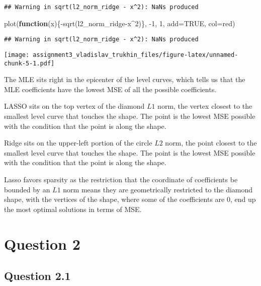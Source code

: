 \documentclass[
]{article}
\newenvironment{Shaded}{\begin{snugshade}}{\end{snugshade}}
\newcommand{\AttributeTok}[1]{\textcolor[rgb]{0.77,0.63,0.00}{#1}}
\newcommand{\ConstantTok}[1]{\textcolor[rgb]{0.00,0.00,0.00}{#1}}
\newcommand{\ControlFlowTok}[1]{\textcolor[rgb]{0.13,0.29,0.53}{\textbf{#1}}}
\newcommand{\DecValTok}[1]{\textcolor[rgb]{0.00,0.00,0.81}{#1}}
\newcommand{\FunctionTok}[1]{\textcolor[rgb]{0.00,0.00,0.00}{#1}}
\newcommand{\NormalTok}[1]{#1}
\newcommand{\SpecialCharTok}[1]{\textcolor[rgb]{0.00,0.00,0.00}{#1}}
\newcommand{\StringTok}[1]{\textcolor[rgb]{0.31,0.60,0.02}{#1}}
\begin{document}
\begin{verbatim}
## Warning in sqrt(l2_norm_ridge - x^2): NaNs produced
\end{verbatim}

\begin{Shaded}
\begin{Highlighting}[]
\FunctionTok{plot}\NormalTok{(}\ControlFlowTok{function}\NormalTok{(x)\{}\SpecialCharTok{{-}}\FunctionTok{sqrt}\NormalTok{(l2\_norm\_ridge}\SpecialCharTok{{-}}\NormalTok{x}\SpecialCharTok{\^{}}\DecValTok{2}\NormalTok{)\}, }\SpecialCharTok{{-}}\DecValTok{1}\NormalTok{, }\DecValTok{1}\NormalTok{, }\AttributeTok{add=}\ConstantTok{TRUE}\NormalTok{, }\AttributeTok{col=}\StringTok{\textquotesingle{}red\textquotesingle{}}\NormalTok{)}
\end{Highlighting}
\end{Shaded}

\begin{verbatim}
## Warning in sqrt(l2_norm_ridge - x^2): NaNs produced
\end{verbatim}

\texttt{[image: assignment3\_vladislav\_trukhin\_files/figure-latex/unnamed-chunk-5-1.pdf]}

The MLE sits right in the epicenter of the level curves, which tells us
that the MLE coefficients have the lowest MSE of all the possible
coefficients.

LASSO sits on the top vertex of the diamond \(L1\) norm, the vertex
closest to the smallest level curve that touches the shape. The point is
the lowest MSE possible with the condition that the point is along the
shape.

Ridge sits on the upper-left portion of the circle \(L2\) norm, the
point closest to the smallest level curve that touches the shape. The
point is the lowest MSE possible with the condition that the point is
along the shape.

Lasso favors sparsity as the restriction that the coordinate of
coefficients be bounded by an \(L1\) norm means they are geometrically
restricted to the diamond shape, with the vertices of the shape, where
some of the coefficients are 0, end up the most optimal solutions in
terms of MSE.

\hypertarget{question-2}{%
\section{Question 2}\label{question-2}}

\hypertarget{question-2.1}{%
\subsection{Question 2.1}\label{question-2.1}}
\end{document}
